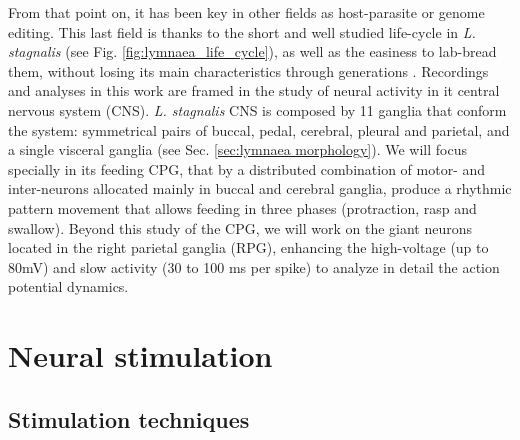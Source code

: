  From that point on, it has been key in other fields as host-parasite or genome editing. This last field is thanks to the short and well studied life-cycle in \textit{L. stagnalis} (see Fig. \ref{fig:lymnaea_life_cycle}), as well as the easiness to lab-bread them, without losing its main characteristics through generations \parencite{noland_observations_1946}. Recordings and analyses in this work are framed in the study of neural activity in it central nervous system (CNS). \textit{L. stagnalis} CNS is composed by 11 ganglia that conform the system: symmetrical pairs of buccal, pedal, cerebral, pleural and parietal, and a single visceral ganglia (see Sec. \ref{sec:lymnaea morphology}). We will focus specially in its feeding CPG, that by a distributed combination of motor- and inter-neurons allocated mainly in buccal and cerebral ganglia, produce a rhythmic pattern movement that allows feeding in three phases (protraction, rasp and swallow). Beyond this study of the CPG, we will work on the giant neurons located in the right parietal ganglia (RPG), enhancing the high-voltage (up to 80mV) and slow activity (30 to 100 ms per spike) to analyze in detail the action potential dynamics. 


\section{Neural stimulation}
\subsection{Stimulation techniques}

